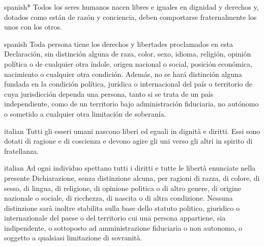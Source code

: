 \documentclass{article}
\begin{document}
\begin{conditext}{spanish}*
Todos los seres humanos nacen libres e iguales en dignidad y derechos
y, dotados como están de razón y conciencia, deben comportarse fraternalmente
los unos con los otros.
\end{conditext}
\begin{conditext}{spanish}
Toda persona tiene los derechos y libertades proclamados en esta
Declaración, sin distinción alguna de raza, color, sexo, idioma,
religión, opinión política o de cualquier otra índole, origen nacional
o social, posición económica, nacimiento o cualquier otra condición.
Además, no se hará distinción alguna fundada en la condición política,
jurídica o internacional del país o territorio de cuya jurisdicción
dependa una persona, tanto si se trata de un país independiente,
como de un territorio bajo administración fiduciaria, no autónomo
o sometido a cualquier otra limitación de soberanía.
\end{conditext}

\begin{conditext}{italian}
Tutti gli esseri umani nascono liberi ed eguali in dignità e diritti.
Essi sono dotati di ragione e di coscienza e devono agire gli uni
verso gli altri in spirito di fratellanza.
\end{conditext}
\begin{conditext}{italian}
Ad ogni individuo spettano tutti i diritti e tutte le libertà enunciate
nella presente Dichiarazione, senza distinzione alcuna, per ragioni
di razza, di colore, di sesso, di lingua, di religione, di opinione
politica o di altro genere, di origine nazionale o sociale, di ricchezza,
di nascita o di altra condizione.
Nessuna distinzione sarà inoltre stabilita sulla base dello statuto
politico, giuridico o internazionale del paese o del territorio cui
una persona appartiene, sia indipendente, o sottoposto ad amministrazione
fiduciaria o non autonomo, o soggetto a qualsiasi limitazione di
sovranità.
\end{conditext}
\end{document}
